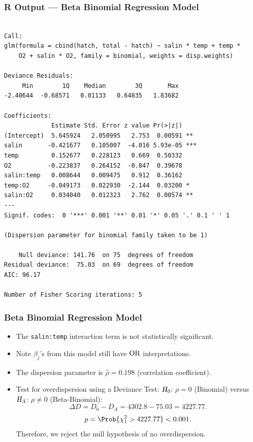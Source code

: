 \documentclass[oneside]{book}\usepackage[]{graphicx}\usepackage[svgnames]{xcolor}
\makeatletter
\newenvironment{kframe}{%
 \def\at@end@of@kframe{}%
 \ifinner\ifhmode%
  \def\at@end@of@kframe{\end{minipage}}%
  \begin{minipage}{\columnwidth}%
 \fi\fi%
 \def\FrameCommand##1{\hskip\@totalleftmargin \hskip-\fboxsep
 \colorbox{shadecolor}{##1}\hskip-\fboxsep
     \hskip-\linewidth \hskip-\@totalleftmargin \hskip\columnwidth}%
 \MakeFramed {\advance\hsize-\width
   \@totalleftmargin\z@ \linewidth\hsize
   \@setminipage}}%
 {\par\unskip\endMakeFramed%
 \at@end@of@kframe}
\newenvironment{knitrout}{}{} %
\let\log\relax%
\newcommand{\HN}{\textsl{H}_{\textsl{0}}}%
\newcommand{\HA}{\textsl{H}_{\textsl{A}}}%
\newcommand{\OR}{\text{OR}}%
\makeatother
\begin{document}
\subsubsection*{R Output --- Beta Binomial Regression Model}
\begin{knitrout}
\color{fgcolor}\begin{kframe}
\begin{verbatim}

Call:
glm(formula = cbind(hatch, total - hatch) ~ salin * temp + temp * 
    O2 + salin * O2, family = binomial, weights = disp.weights)

Deviance Residuals: 
     Min        1Q    Median        3Q       Max  
-2.40644  -0.68571   0.01133   0.64835   1.83682  

Coefficients:
             Estimate Std. Error z value Pr(>|z|)    
(Intercept)  5.645924   2.050995   2.753  0.00591 ** 
salin       -0.421677   0.105007  -4.016 5.93e-05 ***
temp         0.152677   0.228123   0.669  0.50332    
O2          -0.223837   0.264152  -0.847  0.39678    
salin:temp   0.008644   0.009475   0.912  0.36162    
temp:O2     -0.049173   0.022930  -2.144  0.03200 *  
salin:O2     0.034040   0.012323   2.762  0.00574 ** 
---
Signif. codes:  0 '***' 0.001 '**' 0.01 '*' 0.05 '.' 0.1 ' ' 1

(Dispersion parameter for binomial family taken to be 1)

    Null deviance: 141.76  on 75  degrees of freedom
Residual deviance:  75.03  on 69  degrees of freedom
AIC: 96.17

Number of Fisher Scoring iterations: 5
\end{verbatim}
\end{kframe}
\end{knitrout}
\subsubsection*{Beta Binomial Regression Model}
\begin{itemize}
    \item The \texttt{salin:temp} interaction term is not statistically significant.
    \item Note $ \beta_j $'s from this model still have $ \log{\OR} $ interpretations.
    \item The dispersion parameter is $ \hat{\rho}=0.198 $ (correlation coefficient).
    \item Test for overdispersion using a Deviance Test: $ \HN $: $ \rho=0 $ (Binomial) versus $ \HA $: $ \rho\ne 0 $ (Beta-Binomial):
          \[ \Delta D=D_0-D_A=4302.8-75.03=4227.77. \]
          \[ p=\Prob{\chi^2_{1}>4227.77}<0.001. \]
          Therefore, we reject the null hypothesis of no overdispersion.
\end{itemize}
\end{document}
